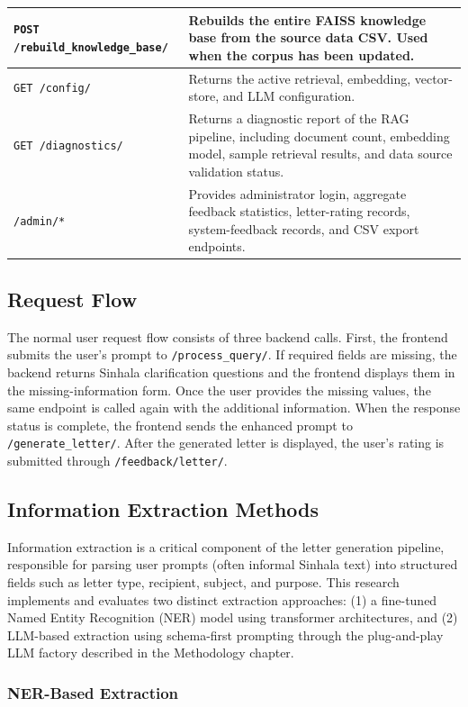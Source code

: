 \documentclass[12pt]{uomthesis}
\begin{document}
\begin{longtable}{@{}p{4.5cm}p{10.1cm}@{}}
\midrule
\texttt{POST /rebuild\_knowledge\_base/} &
Rebuilds the entire FAISS knowledge base from the source data CSV. Used when the corpus has been updated. \\
\midrule
\texttt{GET /config/} &
Returns the active retrieval, embedding, vector-store, and LLM configuration. \\
\midrule
\texttt{GET /diagnostics/} &
Returns a diagnostic report of the RAG pipeline, including document count, embedding model, sample retrieval results, and data source validation status. \\
\midrule
\texttt{/admin/*} &
Provides administrator login, aggregate feedback statistics, letter-rating records, system-feedback records, and CSV export endpoints. \\
\bottomrule
\end{longtable}

\subsection{Request Flow}

The normal user request flow consists of three backend calls. First, the frontend submits the user's prompt to \texttt{/process\_query/}. If required fields are missing, the backend returns Sinhala clarification questions and the frontend displays them in the missing-information form. Once the user provides the missing values, the same endpoint is called again with the additional information. When the response status is complete, the frontend sends the enhanced prompt to \texttt{/generate\_letter/}. After the generated letter is displayed, the user's rating is submitted through \texttt{/feedback/letter/}.

\subsection{Information Extraction Methods}

Information extraction is a critical component of the letter generation pipeline, responsible for parsing user prompts (often informal Sinhala text) into structured fields such as letter type, recipient, subject, and purpose. This research implements and evaluates two distinct extraction approaches: (1) a fine-tuned Named Entity Recognition (NER) model using transformer architectures, and (2) LLM-based extraction using schema-first prompting through the plug-and-play LLM factory described in the Methodology chapter.

\subsubsection{NER-Based Extraction}
\end{document}
